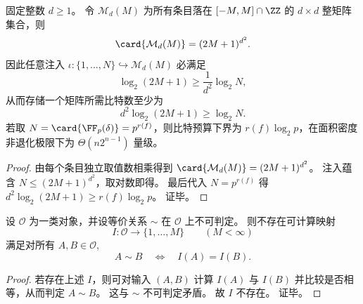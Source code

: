 \begin{proposition}[固定维线性寄存器的比特预算下界]\label{prop:spg-fixed-dim-linear-register-bit-lower-bound}
固定整数 \(d\ge 1\)。
令 \(\mathcal M_d(M)\) 为所有条目落在 \([-M,M]\cap\ZZ\) 的 \(d\times d\) 整矩阵集合，则
\[
\card{\mathcal M_d(M)}=(2M+1)^{d^2}.
\]
因此任意注入 \(\iota:\{1,\dots,N\}\hookrightarrow\mathcal M_d(M)\) 必满足
\[
\log_2(2M+1)\ge \frac{1}{d^2}\log_2 N,
\]
从而存储一个矩阵所需比特数至少为
\[
d^2\log_2(2M+1)\ge \log_2 N.
\]
若取 \(N=\card{\FF_p(\delta)}=p^{r(f)}\)，则比特预算下界为 \(r(f)\log_2 p\)，在面积密度非退化极限下为 \(\Theta(n2^{n-1})\) 量级。
\end{proposition}
\begin{proof}
由每个条目独立取值数相乘得到 \(\card{\mathcal M_d(M)}=(2M+1)^{d^2}\)。
注入蕴含 \(N\le (2M+1)^{d^2}\)，取对数即得。
最后代入 \(N=p^{r(f)}\) 得 \(d^2\log_2(2M+1)\ge r(f)\log_2 p\)。
证毕。
\end{proof}

\begin{proposition}[不可判定等价下不存在有限值的可计算完备不变量]\label{prop:spg-undecidable-no-finite-computable-complete-invariant}
设 \(\mathcal O\) 为一类对象，并设等价关系 \(\sim\) 在 \(\mathcal O\) 上不可判定。
则不存在可计算映射
\[
I:\mathcal O\to\{1,\dots,M\}\qquad (M<\infty)
\]
满足对所有 \(A,B\in\mathcal O\),
\[
A\sim B\quad\Longleftrightarrow\quad I(A)=I(B).
\]
\end{proposition}
\begin{proof}
若存在上述 \(I\)，则可对输入 \((A,B)\) 计算 \(I(A)\) 与 \(I(B)\) 并比较是否相等，从而判定 \(A\sim B\)。
这与 \(\sim\) 不可判定矛盾。
故 \(I\) 不存在。
证毕。
\end{proof}


